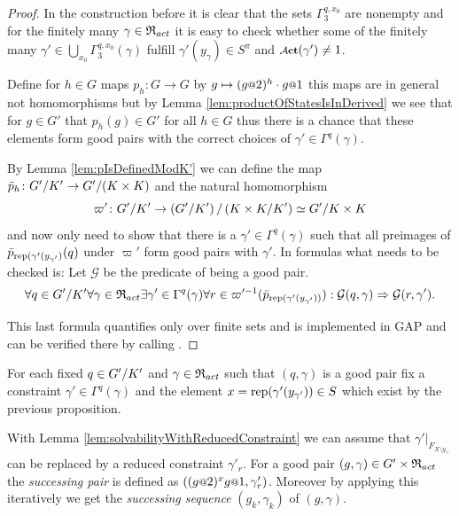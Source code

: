 \documentclass[a4paper,11pt]{amsart}
\begin{document}
\begin{proof}
 In the construction before it is clear that the sets $\Gamma_3^{q,x_0}$ are nonempty and for the finitely many $\gamma\in \mathfrak{R}_{act}$ it is
 easy to check whether some of the finitely many $\gamma'\in\bigcup_{x_0}\Gamma_3^{q,x_0}(\gamma)$ fulfill $\gamma'(y_\gamma) \in S^\pi$ and $\act(\gamma')\neq 1$.
 
 
  Define for $h\in G$ maps $p_h\colon G\to G$ by $g\mapsto (g\at{2})^{h}\cdot g\at{1}$ this maps are in general not homomorphisms but 
  by Lemma \ref{lem:productOfStatesIsInDerived} we see that for $g\in G'$ that $p_h(g)\in G'$ for all $h\in G$ thus there is a chance that these elements form good pairs with
  the correct choices of $\gamma' \in \Gamma^q(\gamma)$. 
 
  By Lemma \ref{lem:pIsDefinedModK'} we can define the map $\bar p_h\colon {G'/K'} \to {G'/(K\times K)}$
 and the natural homomorphism \[\varpi'\colon {G'/K'} \to {\left({G'/K'}\right)/\left({K\times K/K'}\right)} \simeq {G'/K\times K} \]
 and now only need to show that there is a $\gamma'\in\Gamma^q(\gamma)$ such that all preimages of $\bar p_{\textup{rep}(\gamma'(y_{\gamma'})}(q)$ under $\varpi'$ 
 form good pairs with $\gamma'$. In formulas what needs to be checked is: Let $\mathcal{G}$ be the predicate of being a good pair. %
 \[\forall q\in{G'/K'}
      \forall \gamma\in\mathfrak{R}_{act} 
	 \exists \gamma'\in \Gamma^q(\gamma)
	    \forall r\in \varpi'^{-1}(\bar p_{\textup{rep}(\gamma'(y_{\gamma'}))}):
	      \mathcal{G}(q,\gamma) \Rightarrow \mathcal{G}(r,\gamma').\]
 
 This last formula quantifies only over finite sets and is implemented in GAP and can be verified there by calling . 
 \end{proof}

 \begin{defi}
 For each fixed $q\in{G'/K'}$ and $\gamma\in \mathfrak{R}_{act}$ such that $(q,\gamma)$ is a good pair
 fix a constraint $\gamma'\in\Gamma^q(\gamma)$ and the element $x=\textup{rep}(\gamma'(y_{\gamma'}))\in S$ which exist by the previous proposition.
 
 With Lemma \ref{lem:solvabilityWithReducedConstraint} we can assume that $\gamma'|_{F_{X\setminus y_{\gamma'}}}$ can be replaced by a reduced constraint $\gamma'_r$. 
 For a good pair $(g,\gamma)\in G'\times\mathfrak{R}_{act}$ the \emph{successing pair} is defined as $\left((g\at{2})^xg\at{1},\gamma'_r\right)$.
 Moreover by applying this iteratively we get the \emph{successing sequence} $(g_k,\gamma_k)$ of $(g,\gamma)$.
 \end{defi}
 
\end{document}
